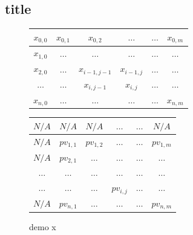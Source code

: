 \subsection{title}

\begin{figure}
	\centering
	\caption{demo x}
	\begin{tabular}{|c | c |c | c |c | c |} \hline
		$x_{0, 0}$ & $x_{0, 1}$ & $x_{0, 2}$                         & $\dots$                           & $\dots$ & $x_{0, m}$ \\ \hline
		$x_{1, 0}$ & $\dots$    & $\dots$                            & $\dots$                           & $\dots$ & $\dots$    \\ \hline 
		$x_{2, 0}$ & $\dots$    & \cellcolor{blue!10} $x_{i-1, j-1}$ & \cellcolor{blue!10}$x_{i - 1, j}$ & $\dots$ & $\dots$    \\ \hline 
		$\dots$    & $\dots$    & \cellcolor{blue!10}$x_{i, j - 1}$  & \cellcolor{blue!10}$x_{i, j}$     & $\dots$ & $\dots$    \\ \hline 
		$x_{n, 0}$ & $\dots$    & $\dots$                            & $\dots$                           & $\dots$ & $x_{n, m}$ \\ \hline 
	\end{tabular}
	
	\begin{tabular}{|c | c |c | c |c | c |} \hline
		\rowcolor{lightgray}
		\cellcolor{lightgray}$N/A$   & $N/A$       & $N/A$       & $\dots$                        & $\dots$ & $N/A$       \\ \hline
		\cellcolor{lightgray}$N/A$   & $pv_{1, 1}$ & $pv_{1, 2}$ & $\dots$                        & $\dots$ & $pv_{1, m}$ \\ \hline
		\cellcolor{lightgray}$N/A$   & $pv_{2, 1}$ & $\dots$     & $\dots$                        & $\dots$ & $\dots$     \\ \hline 
		\cellcolor{lightgray}$\dots$ & $\dots$     & $\dots$     & $\dots$                        & $\dots$ & $\dots$     \\ \hline 
		\cellcolor{lightgray}$\dots$ & $\dots$     & $\dots$     & \cellcolor{blue!10}$pv_{i, j}$ & $\dots$ & $\dots$     \\ \hline 
		\cellcolor{lightgray}$N/A$   & $pv_{n, 1}$ & $\dots$     & $\dots$                        & $\dots$ & $pv_{n, m}$ \\ \hline 
	\end{tabular}

\end{figure}



